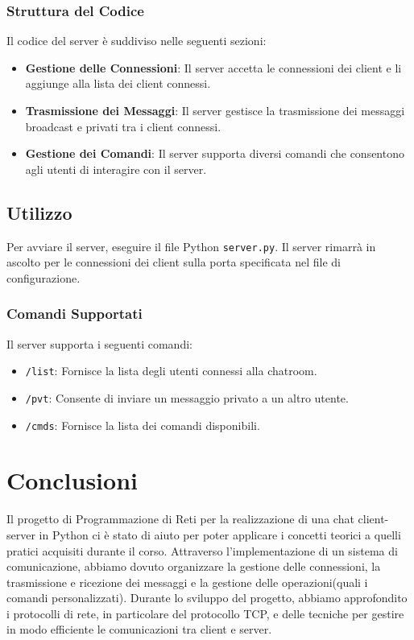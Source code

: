 \documentclass[a4paper,12pt]{report}
\begin{document}
\subsection{Struttura del Codice}
Il codice del server è suddiviso nelle seguenti sezioni:
\begin{itemize}
	\item \textbf{Gestione delle Connessioni}: Il server accetta le connessioni dei client e li aggiunge alla lista dei client connessi.
	\item \textbf{Trasmissione dei Messaggi}: Il server gestisce la trasmissione dei messaggi broadcast e privati tra i client connessi.
	\item \textbf{Gestione dei Comandi}: Il server supporta diversi comandi che consentono agli utenti di interagire con il server.
\end{itemize}
\section{Utilizzo}
Per avviare il server, eseguire il file Python \texttt{server.py}. Il server rimarrà in ascolto per le connessioni dei client sulla porta specificata nel file di configurazione.
\subsection{Comandi Supportati}
Il server supporta i seguenti comandi:
\begin{itemize}
	\item \texttt{/list}: Fornisce la lista degli utenti connessi alla chatroom.
	\item \texttt{/pvt}: Consente di inviare un messaggio privato a un altro utente.
	\item \texttt{/cmds}: Fornisce la lista dei comandi disponibili.
\end{itemize}

\chapter{Conclusioni}
Il progetto di Programmazione di Reti per la realizzazione di una chat client-server in Python ci è stato di aiuto per poter applicare i concetti teorici a quelli pratici acquisiti durante il corso. Attraverso l'implementazione di un sistema di comunicazione, abbiamo dovuto organizzare la gestione delle connessioni, la trasmissione e ricezione dei messaggi e la gestione delle operazioni(quali i comandi personalizzati).
Durante lo sviluppo del progetto, abbiamo approfondito i protocolli di rete, in particolare del protocollo TCP, e delle tecniche per gestire in modo efficiente le comunicazioni tra client e server. 
\end{document}
